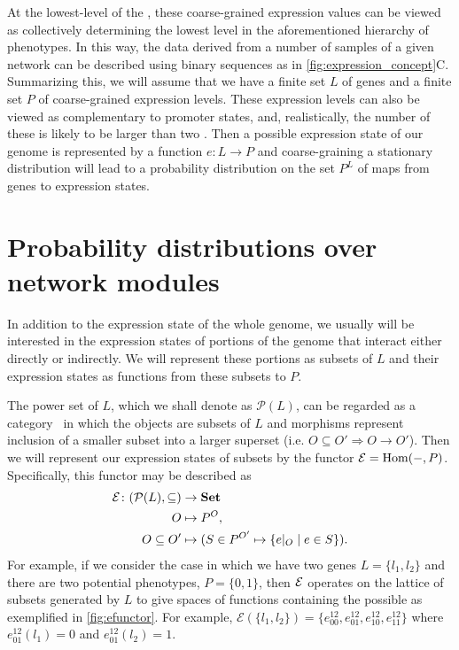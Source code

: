 At the lowest-level of the \gnpm{}, these coarse-grained expression values can be viewed as collectively determining the lowest level in the aforementioned hierarchy of phenotypes. In this way, the data derived from a number of samples of a given network can be described using binary sequences as in \ref{fig:expression_concept}C.  Summarizing this, we will assume that we have a finite set $L$ of genes and a finite set $P$ of coarse-grained expression levels. These expression levels can also be viewed as complementary to promoter states, and, realistically, the number of these is likely to be larger than two \cite{Rieckh2013a}.  Then a possible expression state of our genome is represented by a function $e : L \to P$ and coarse-graining a stationary distribution will lead to a probability distribution on the set $P^L$ of maps from genes to expression states.

\section{Probability distributions over network modules}\label{sec:probabilitydistributionsonnetworks}

In addition to the expression state of the whole genome, we usually will be interested in the expression states of portions of the genome that interact either directly or indirectly.  We will represent these portions as subsets of $L$ and their expression states as functions from these subsets to $P$.

The power set of $L$, which we shall denote as $\mathcal{P}(L)$, can be regarded  as a category~\cite{Lane1998,MacLane1992,Awodey2006} in which the objects are subsets of $L$ and morphisms represent inclusion of a smaller subset into a larger superset (i.e. $O \subseteq O' \Rightarrow O \rightarrow O'$).  Then we will represent our expression states of subsets by the functor $\mathcal{E} = \mathrm{Hom}(-,P)$.  Specifically, this functor may be described as
\begin{equation}\label{eq:gpfunctor}
\begin{split}
\expr \colon (\mathcal{P}(L), \subseteq) &\to \mathbf{Set} \\
O &\mapsto P^O,\\
O \subseteq O' &\mapsto (S \in P^{O'} \mapsto \{e|_O \mid e \in S\}). %
\end{split}
\end{equation}
For example, if we consider the case in which we have two genes $L=\{l_1,l_2\}$ and there are two potential phenotypes, $P=\{0,1\}$, then $\mathcal{E}$ operates on the lattice of subsets generated by $L$ to give spaces of functions containing the possible \gnpm{} as exemplified in \ref{fig:efunctor}. For example, $\mathcal{E}(\{l_1,l_2\}) = \{ e^{12}_{00},e^{12}_{01},e^{12}_{10},e^{12}_{11} \}$ where $e^{12}_{01}(l_1) = 0$ and $e^{12}_{01}(l_2) = 1$.

